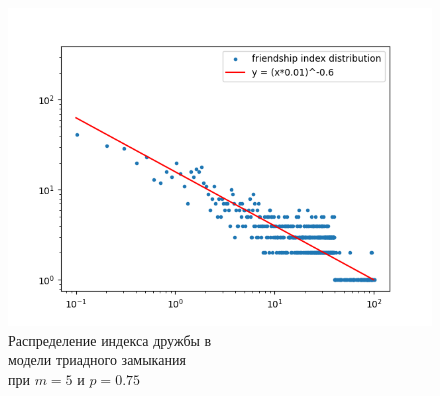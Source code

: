 \documentclass[bachelor, och, diploma]{SCWorks}
\begin{document}
\begin{figure}[!ht]
    \centering
    \includegraphics[scale=0.7]{diploma_results/static_log/triad_dist_beta_5_0.75.png}
    \caption{Распределение индекса дружбы  в\\ модели триадного замыкания\\ при $m=5$ и $p=0.75$}
\end{figure}
\end{document}
